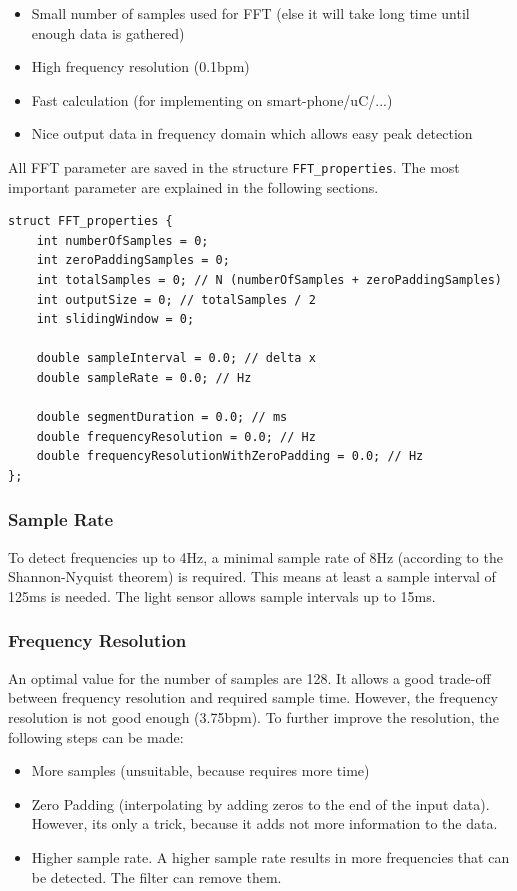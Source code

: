 \documentclass[notitlepage]{scrreprt}
\begin{document}
\begin{itemize}
	\item{Small number of samples used for FFT (else it will take long time until enough data is gathered)}
	\item{High frequency resolution (0.1bpm)}
	\item{Fast calculation (for implementing on smart-phone/uC/...)}
	\item{Nice output data in frequency domain which allows easy peak detection}\\
\end{itemize}

All FFT parameter are saved in the structure \lstinline{FFT_properties}. The most important parameter are explained in the following sections.

\begin{lstlisting}
struct FFT_properties {
    int numberOfSamples = 0;
    int zeroPaddingSamples = 0;
    int totalSamples = 0; // N (numberOfSamples + zeroPaddingSamples)
    int outputSize = 0; // totalSamples / 2
    int slidingWindow = 0;

    double sampleInterval = 0.0; // delta x
    double sampleRate = 0.0; // Hz

    double segmentDuration = 0.0; // ms
    double frequencyResolution = 0.0; // Hz
    double frequencyResolutionWithZeroPadding = 0.0; // Hz
};
\end{lstlisting}

\subsubsection{Sample Rate}
To detect frequencies up to 4Hz, a minimal sample rate of 8Hz (according to the Shannon-Nyquist theorem) is required. This means at least a sample interval of 125ms is needed. The light sensor allows sample intervals up to 15ms.

\subsubsection{Frequency Resolution}
An optimal value for the number of samples are 128. It allows a good trade-off between frequency resolution and required sample time. However, the frequency resolution is not good enough (3.75bpm). To further improve the resolution, the following steps can be made:

\begin{itemize}
	\item{More samples (unsuitable, because requires more time)}
	\item{Zero Padding (interpolating by adding zeros to the end of the input data). However, its only a trick, because it adds not more information to the data.}
	\item{Higher sample rate. A higher sample rate results in more frequencies that can be detected. The filter can remove them.}
\end{itemize}
\end{document}
